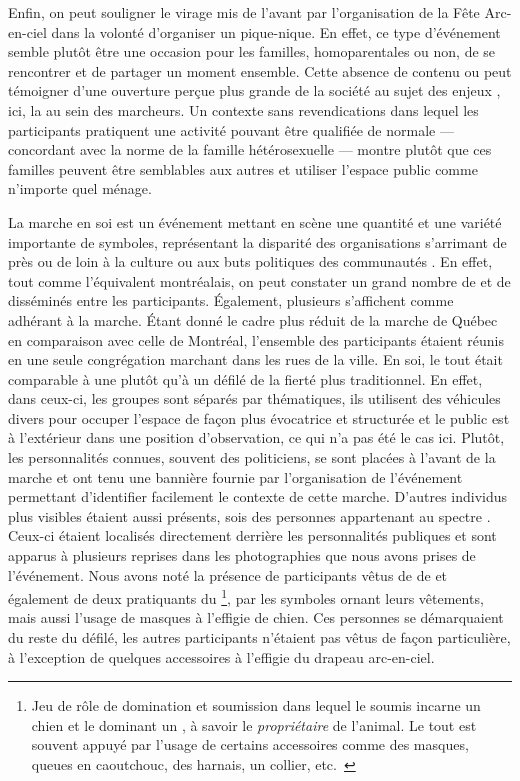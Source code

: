 Enfin, on peut souligner le virage  mis de l'avant par l'organisation de la Fête Arc-en-ciel dans la volonté d'organiser un pique-nique.
En effet, ce type d'événement semble plutôt être une occasion pour les familles, homoparentales ou non, de se rencontrer et de partager un moment ensemble.
Cette absence de contenu  ou  peut témoigner d'une ouverture perçue plus grande de la société au sujet des enjeux \lgbt, ici, la  au sein des marcheurs.
Un contexte sans revendications dans lequel les participants pratiquent une activité pouvant être qualifiée de normale --- concordant avec la norme de la famille hétérosexuelle --- montre plutôt que ces familles peuvent être semblables aux autres et utiliser l'espace public comme n'importe quel ménage.

La marche en soi est un événement mettant en scène une quantité et une variété importante de symboles, représentant la disparité des organisations s'arrimant de près ou de loin à la culture ou aux buts politiques des communautés \lgbt.
En effet, tout comme l'équivalent montréalais, on peut constater un grand nombre de  et de  disséminés entre les participants.
Également, plusieurs  s'affichent comme adhérant à la marche.
Étant donné le cadre plus réduit de la marche de Québec en comparaison avec celle de Montréal, l'ensemble des participants étaient réunis en une seule congrégation marchant dans les rues de la ville.
En soi, le tout était comparable à une  plutôt qu'à un défilé de la fierté plus traditionnel.
En effet, dans ceux-ci, les groupes sont séparés par thématiques, ils utilisent des véhicules divers pour occuper l'espace de façon plus évocatrice et structurée et le public est à l'extérieur dans une position d'observation, ce qui n'a pas été le cas ici.
Plutôt, les personnalités connues, souvent des politiciens, se sont placées à l'avant de la marche et ont tenu une bannière fournie par l'organisation de l'événement permettant d'identifier facilement le contexte de cette marche.
D'autres individus plus visibles étaient aussi présents, sois des personnes appartenant au spectre \bdsm{}.
Ceux-ci étaient localisés directement derrière les personnalités publiques et sont apparus à plusieurs reprises dans les photographies que nous avons prises de l'événement.
Nous avons noté la présence de participants vêtus de  de  et également de deux pratiquants du \footnote{Jeu de rôle de domination et soumission dans lequel le soumis incarne un chien et le dominant un , à savoir le \emph{propriétaire} de l'animal.
Le tout est souvent appuyé par l'usage de certains accessoires comme des masques, queues en caoutchouc, des harnais, un collier, etc.~\citep[voir][5]{Wignall2015}}, par les symboles ornant leurs vêtements, mais aussi l'usage de masques à l'effigie de chien.
Ces personnes se démarquaient du reste du défilé, les autres participants n'étaient pas vêtus de façon particulière, à l'exception de quelques accessoires à l'effigie du drapeau arc-en-ciel.

